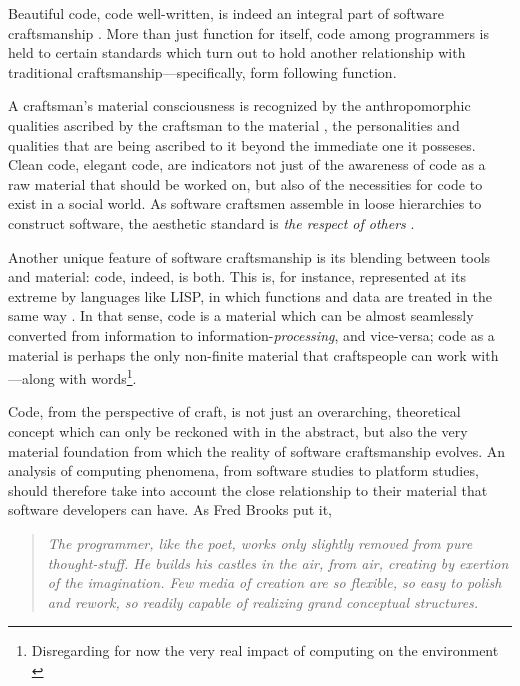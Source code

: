 Beautiful code, code well-written, is indeed an integral part of software craftsmanship \citep{oram_beautiful_2007}. More than just function for itself, code among programmers is held to certain standards which turn out to hold another relationship with traditional craftsmanship—specifically, form following function.

A craftsman's material consciousness is recognized by the anthropomorphic qualities ascribed by the craftsman to the material \citep{sennett_craftsman_2009}, the personalities and qualities that are being ascribed to it beyond the immediate one it posseses. Clean code, elegant code, are indicators not just of the awareness of code as a raw material that should be worked on, but also of the necessities for code to exist in a social world. As software craftsmen assemble in loose hierarchies to construct software, the aesthetic standard is \emph{the respect of others} \citep{abelson_structure_1979}.

Another unique feature of software craftsmanship is its blending between tools and material: code, indeed, is both. This is, for instance, represented at its extreme by languages like LISP, in which functions and data are treated in the same way \citep{mccarthy_lisp_1965}. In that sense, code is a material which can be almost seamlessly converted from information to information-\emph{processing}, and vice-versa; code as a material is perhaps the only non-finite material that craftspeople can work with---along with words\footnote{Disregarding for now the very real impact of computing on the environment \citep{kurp_green_2008}}.

Code, from the perspective of craft, is not just an overarching, theoretical concept which can only be reckoned with in the abstract, but also the very material foundation from which the reality of software craftsmanship evolves. An analysis of computing phenomena, from software studies to platform studies, should therefore take into account the close relationship to their material that software developers can have. As Fred Brooks put it,

\begin{quote}
  \textit{The programmer, like the poet, works only slightly removed from pure thought-stuff. He builds his castles in the air, from air, creating by exertion of the imagination. Few media of creation are so flexible, so easy to polish and rework, so readily capable of realizing grand conceptual structures. \citep{brooks_mythical_1975}}
\end{quote}

